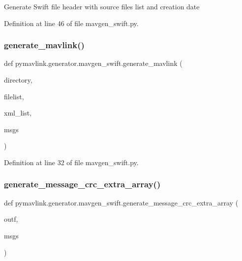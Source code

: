 \begin{DoxyVerb}Generate Swift file header with source files list and creation date\end{DoxyVerb}
 

Definition at line 46 of file mavgen\+\_\+swift.\+py.

\mbox{\label{namespacepymavlink_1_1generator_1_1mavgen__swift_af3cee7a3866c8d6309e4dfc23284aa08}} 
\subsubsection{\texorpdfstring{generate\_mavlink()}{generate\_mavlink()}}
{\footnotesize\ttfamily def pymavlink.\+generator.\+mavgen\+\_\+swift.\+generate\+\_\+mavlink (\begin{DoxyParamCaption}\item[{}]{directory,  }\item[{}]{filelist,  }\item[{}]{xml\+\_\+list,  }\item[{}]{msgs }\end{DoxyParamCaption})}



Definition at line 32 of file mavgen\+\_\+swift.\+py.

\mbox{\label{namespacepymavlink_1_1generator_1_1mavgen__swift_a85b6d1f85489a4db64118a6ee05004dc}} 
\subsubsection{\texorpdfstring{generate\_message\_crc\_extra\_array()}{generate\_message\_crc\_extra\_array()}}
{\footnotesize\ttfamily def pymavlink.\+generator.\+mavgen\+\_\+swift.\+generate\+\_\+message\+\_\+crc\+\_\+extra\+\_\+array (\begin{DoxyParamCaption}\item[{}]{outf,  }\item[{}]{msgs }\end{DoxyParamCaption})}

